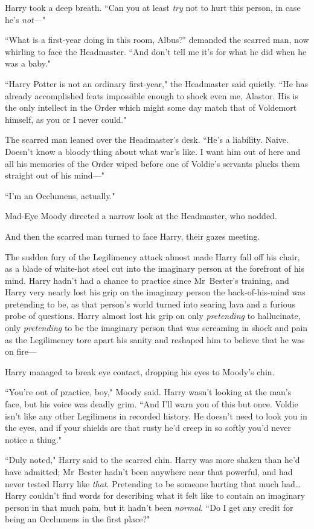 Harry took a deep breath. ``Can you at least \emph{try} not to hurt this person, in case he's \emph{not—}"

``What is a first-year doing in this room, Albus?" demanded the scarred man, now whirling to face the Headmaster. ``And don't tell me it's for what he did when he was a baby."

``Harry Potter is not an ordinary first-year," the Headmaster said quietly. ``He has already accomplished feats impossible enough to shock even me, Alastor. His is the only intellect in the Order which might some day match that of Voldemort himself, as you or I never could."

The scarred man leaned over the Headmaster's desk. ``He's a liability. Naive. Doesn't know a bloody thing about what war's like. I want him out of here and all his memories of the Order wiped before one of Voldie's servants plucks them straight out of his mind—"

``I'm an Occlumens, actually."

Mad-Eye Moody directed a narrow look at the Headmaster, who nodded.

And then the scarred man turned to face Harry, their gazes meeting.

The sudden fury of the Legilimency attack almost made Harry fall off his chair, as a blade of white-hot steel cut into the imaginary person at the forefront of his mind. Harry hadn't had a chance to practice since Mr~Bester's training, and Harry very nearly lost his grip on the imaginary person the back-of-his-mind was pretending to be, as that person's world turned into searing lava and a furious probe of questions. Harry almost lost his grip on only \emph{pretending} to hallucinate, only \emph{pretending} to be the imaginary person that was screaming in shock and pain as the Legilimency tore apart his sanity and reshaped him to believe that he was on fire—

Harry managed to break eye contact, dropping his eyes to Moody's chin.

``You're out of practice, boy," Moody said. Harry wasn't looking at the man's face, but his voice was deadly grim. ``And I'll warn you of this but once. Voldie isn't like any other Legilimens in recorded history. He doesn't need to look you in the eyes, and if your shields are that rusty he'd creep in so softly you'd never notice a thing."

``Duly noted," Harry said to the scarred chin. Harry was more shaken than he'd have admitted; Mr~Bester hadn't been anywhere near that powerful, and had never tested Harry like \emph{that}. Pretending to be someone hurting that much had{\ldots} Harry couldn't find words for describing what it felt like to contain an imaginary person in that much pain, but it hadn't been \emph{normal}. ``Do I get any credit for being an Occlumens in the first place?"

